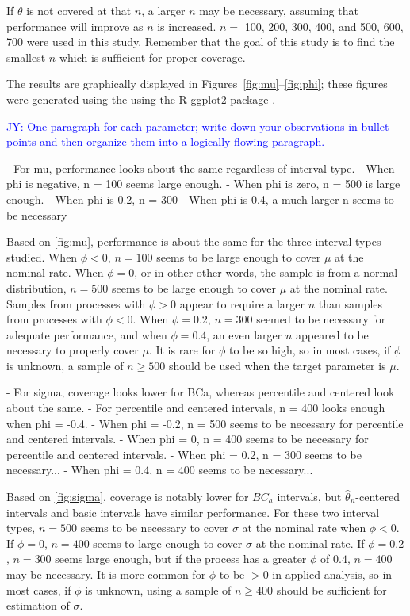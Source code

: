 \documentclass[12pt, letterpaper, titlepage]{article}
\newcommand{\jy}[1]{\textcolor{blue}{JY: #1}}
\begin{document}
If $\theta$ is not covered at that $n$, a larger $n$ may be
necessary, assuming that performance will improve as $n$ is increased. $n =$
100, 200, 300, 400, and 500, 600, 700 were used in this study. Remember that
the goal of this study is to find the smallest $n$ which is sufficient for
proper coverage.


The results are graphically displayed in Figures~\ref{fig:mu}--\ref{fig:phi};
these figures were generated using the using
the R ggplot2 package \citep{ggplot2}.



\jy{One paragraph for each parameter; write down your observations in bullet
  points and then organize them into a logically flowing paragraph.}

- For mu, performance looks about the same regardless of interval type.
- When phi is negative, n = 100 seems large enough.
- When phi is zero, n = 500 is large enough.
- When phi is 0.2, n = 300
- When phi is 0.4, a much larger n seems to be necessary

Based on \ref{fig:mu}, performance is
about the same for the three interval types studied. When $\phi < 0$,
$n = 100$ seems to  be large enough to cover $\mu$ at the nominal rate. When
$\phi = 0$, or in other other words, the sample is from a normal distribution,
$n = 500$ seems to be large enough to cover $\mu$ at the nominal rate. Samples
from processes with $\phi > 0$ appear to require a larger $n$ than samples from
processes with $\phi < 0$. When $\phi = 0.2$, $n = 300$ seemed to be necessary
for adequate performance, and when $\phi = 0.4$, an even larger $n$ appeared
to be necessary to properly cover $\mu$. It is rare for $\phi$ to be so high,
so in most cases, if $\phi$ is unknown, a sample of $n \geq 500$ should be
used when the target parameter is $\mu$. 


- For sigma, coverage looks lower for BCa, whereas percentile and centered
look about the same.
- For percentile and centered intervals, n = 400 looks enough when phi = -0.4.
- When phi = -0.2, n = 500 seems to be necessary for percentile and centered
intervals.
- When phi = 0, n = 400 seems to be necessary for percentile and centered
intervals.
- When phi = 0.2, n = 300 seems to be necessary...
- When phi = 0.4, n = 400 seems to be necessary...


Based on \ref{fig:sigma}, coverage is
notably lower for $BC_a$ intervals, but $\hat{\theta}_{n}$-centered intervals
and basic intervals have similar performance. For these two interval types,
$n = 500$ seems to be necessary to cover $\sigma$ at the nominal rate when
$\phi < 0$. If $\phi = 0$, $n = 400$ seems to large enough to cover $\sigma$ at
the nominal rate. If $\phi = 0.2$, $n = 300$ seems large enough, but if the
process has a greater $\phi$ of $0.4$, $n = 400$ may be necessary. It is more
common for $\phi$ to be $> 0$ in applied analysis, so in most cases, if $\phi$
is unknown, using a sample of $n \geq 400$ should be sufficient for estimation
of $\sigma$.
\end{document}
